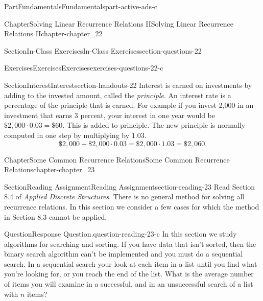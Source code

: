 \documentclass[oneside,10pt,]{book}
\numberwithin{equation}{section}
\begin{document}
\begin{partptx}{Part}{Fundamentals}{}{Fundamentals}{}{}{part-active-ads-c}
\begin{chapterptx}{Chapter}{Solving Linear Recurrence Relations II}{}{Solving Linear Recurrence Relations II}{}{}{chapter-chapter_22}
\begin{sectionptx}{Section}{In-Class Exercises}{}{In-Class Exercises}{}{}{section-questions-22}
\begin{exercises-subsection-numberless}{Exercises}{Exercises}{}{Exercises}{}{}{exercises-questions-22-c}
\end{exercises-subsection-numberless}
\end{sectionptx}
%
%
\typeout{************************************************}
\typeout{************************************************}
%
\begin{sectionptx}{Section}{Interest}{}{Interest}{}{}{section-handouts-22}
Interest is earned on investments by adding to the invested amount, called the \emph{principle}. An interest rate is a percentage of the principle that is earned.  For example if you invest \textdollar{}2,000 in an investment  that earns 3 percent, your interest in one year would be \(\$2,000\cdot 0.03 =\$60\).  This is added to principle.  The new principle is normally computed in one step by multiplying by \(1.03\).%
\begin{equation*}
\$2,000+ \$2,000\cdot 0.03 =\$2,000\cdot 1.03 =  \$2,060.
\end{equation*}
%
\end{sectionptx}
\end{chapterptx}
%
\typeout{************************************************}
\typeout{************************************************}
%
\begin{chapterptx}{Chapter}{Some Common Recurrence Relations}{}{Some Common Recurrence Relations}{}{}{chapter-chapter_23}
\renewcommand*{\chaptername}{Chapter}
\index{}%
%
%
\typeout{************************************************}
\typeout{************************************************}
%
\begin{sectionptx}{Section}{Reading Assignment}{}{Reading Assignment}{}{}{section-reading-23}
Read Section 8.4 of \emph{Applied Discrete Structures}. There is no general method for solving all recurrence relations.  In this section we consider a few cases for which the method in Section 8.3 cannot be applied.%
\begin{question}{Question}{Response Question.}{question-reading-23-c}%
In this section we study algorithms for searching and sorting.  If you have data that isn't sorted, then the binary search algorithm can't be implemented and you must do a sequential search. In a sequential search your look at each item in a list until you find what you're looking for, or you reach the end of the list.  What is the average number of items you will examine in a successful, and in an unsuccessful search of a list with \(n\) items?%
\end{question}

\end{sectionptx}
\end{chapterptx}
\end{partptx}
\end{document}
